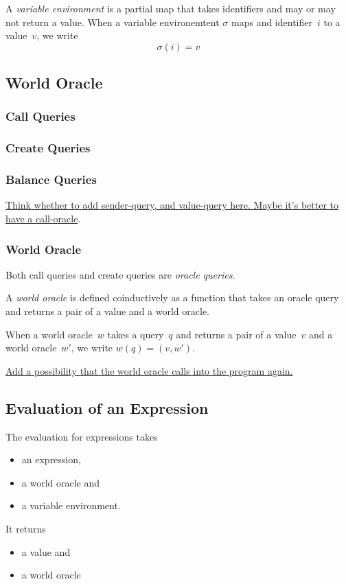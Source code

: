 \documentclass{book}
\newcommand{\todo}[1]{\underline{#1}}
\begin{document}
A \textit{variable environment} is a partial map that takes identifiers and may or may not return a value.  When a variable environemtent $\sigma$ maps and identifier~$i$ to a value~$v$, we write
\[
\sigma(i) = v
\]


\subsection{World Oracle}

\subsubsection{Call Queries}

\subsubsection{Create Queries}

\subsubsection{Balance Queries}


\todo{Think whether to add sender-query, and value-query here.  Maybe it's better to have a call-oracle}.

\subsubsection{World Oracle}

Both call queries and create queries are \textit{oracle queries}.

A \textit{world oracle} is defined coinductively as a function that takes an oracle query and returns a pair of a value and a world oracle.

When a world oracle~$w$ takes a query~$q$ and returns a pair of a value~$v$ and a world oracle~$w'$, we write $w(q) = (v, w')$.

\todo{Add a possibility that the world oracle calls into the program again.}

\subsection{Evaluation of an Expression}

The evaluation for expressions takes
\begin{itemize}
\item an expression,
\item a world oracle and
\item a variable environment.
\end{itemize}
It returns
\begin{itemize}
\item a value and
\item a world oracle
\end{itemize}
\end{document}
